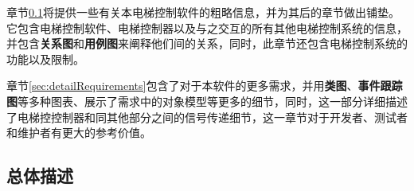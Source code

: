章节\ref{sec:generalDescription}将提供一些有关本电梯控制软件的粗略信息，并为其后的章节做出铺垫。它包含电梯控制软件、电梯控制器以及与之交互的所有其他电梯控制系统的信息，并包含\textbf{关系图}和\textbf{用例图}来阐释他们间的关系，同时，此章节还包含电梯控制系统的功能以及限制。\par

章节\ref{sec:detailRequirements}包含了对于本软件的更多需求，并用\textbf{类图}、\textbf{事件跟踪图}等多种图表、展示了需求中的对象模型等更多的细节，同时，这一部分详细描述了电梯控控制器和同其他部分之间的信号传递细节，这一章节对于开发者、测试者和维护者有更大的参考价值。\par

\subsection{总体描述}
\label{sec:generalDescription}

